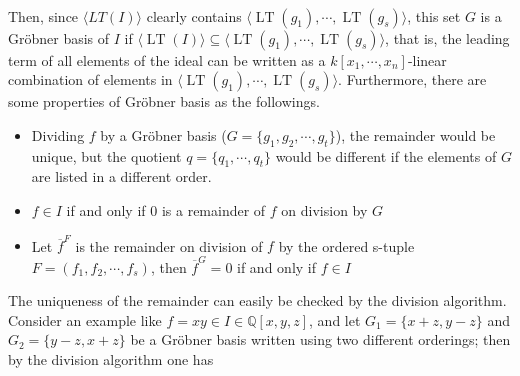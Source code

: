 \documentclass{article}
\newtheorem{theorem}{Theorem}[section]
\newtheorem{corollary}{Corollary}[theorem]
\newcommand{\lt}{\ensuremath{\operatorname{LT}}}
\theoremstyle{definition}
\theoremstyle{remark}
\theoremstyle{example}
\begin{document}



\paragraph{}

Then, since $\langle LT(I)\rangle$ clearly contains $\langle \lt(g_1), \cdots, \lt(g_s) \rangle$, this set $G$ is a Gröbner basis of $I$ if $\langle \lt(I) \rangle \subseteq \langle \lt(g_1),\cdots, \lt(g_s) \rangle$, that is, the leading term of all elements of the ideal can be written as a $k[x_1, \cdots, x_n]$-linear combination of elements in $\langle \lt(g_1), \cdots, \lt(g_s) \rangle$. Furthermore, there are some properties of Gröbner basis as the followings.

\begin{itemize}
    \item Dividing $f$ by a Gröbner basis ($G = \{g_1, g_2, \cdots, g_t\}$), the remainder would be unique, but the quotient $q = \{q_1,\cdots,q_t\}$ would be different if the elements of $G$ are listed in a different order.
    \item $f \in I$ if and only if $0$ is a remainder of $f$ on division by $G$
    \item Let $\overline{f}^{F}$ is the remainder on division of $f$ by the ordered s-tuple $F = (f_1, f_2, \cdots, f_s)$, then $\overline{f}^{G} = 0$ if and only if $f \in I$
\end{itemize}

The uniqueness of the remainder can easily be checked by the division algorithm. Consider an example like $f = xy \in I \in \mathbb{Q}[x,y,z]$, and let $G_1 = \{x+z,y-z\}$ and $G_2 = \{y-z,x+z\}$ be a Gröbner basis written using two different orderings; then by the division algorithm one has
\end{document}
